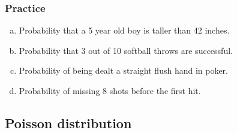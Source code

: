 \begin{frame}
\frametitle{Practice}


\begin{enumerate}[(a)]

\item Probability that a 5 year old boy is taller than 42 inches.

\item Probability that 3 out of 10 softball throws are successful.

\item Probability of being dealt a straight flush hand in poker.

\item Probability of missing 8 shots before the first hit.


\end{enumerate}

\end{frame}


\subsection{Poisson distribution}


